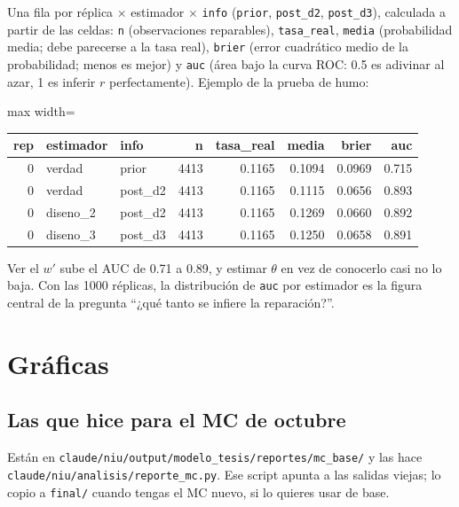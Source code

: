 \documentclass[11pt]{article}
\newcommand{\col}[1]{\texttt{#1}}
\begin{document}
Una fila por réplica $\times$ estimador $\times$ \col{info} (\col{prior}, \col{post\_d2},
\col{post\_d3}), calculada a partir de las celdas:
\col{n} (observaciones reparables), \col{tasa\_real}, \col{media} (probabilidad media; debe
parecerse a la tasa real), \col{brier} (error cuadrático medio de la probabilidad; menos es
mejor) y \col{auc} (área bajo la curva ROC: 0.5 es adivinar al azar, 1 es inferir $r$
perfectamente). Ejemplo de la prueba de humo:
\begin{center}\footnotesize
\begin{adjustbox}{max width=\textwidth}\begin{tabular}{rllrrrrr}
\toprule
rep & estimador & info & n & tasa\_real & media & brier & auc\\
\midrule
0 & verdad & prior & 4413 & 0.1165 & 0.1094 & 0.0969 & 0.715\\
0 & verdad & post\_d2 & 4413 & 0.1165 & 0.1115 & 0.0656 & 0.893\\
0 & diseno\_2 & post\_d2 & 4413 & 0.1165 & 0.1269 & 0.0660 & 0.892\\
0 & diseno\_3 & post\_d3 & 4413 & 0.1165 & 0.1250 & 0.0658 & 0.891\\
\bottomrule
\end{tabular}\end{adjustbox}
\end{center}
Ver el $w'$ sube el AUC de 0.71 a 0.89, y estimar $\theta$ en vez de conocerlo casi no lo
baja. Con las 1000 réplicas, la distribución de \col{auc} por estimador es la figura central
de la pregunta ``¿qué tanto se infiere la reparación?''.

\section{Gráficas}

\subsection{Las que hice para el MC de octubre}

Están en \texttt{claude/niu/output/modelo\_tesis/reportes/mc\_base/} y las hace
\texttt{claude/niu/analisis/reporte\_mc.py}. Ese script apunta a las salidas viejas; lo copio
a \texttt{final/} cuando tengas el MC nuevo, si lo quieres usar de base.
\end{document}
